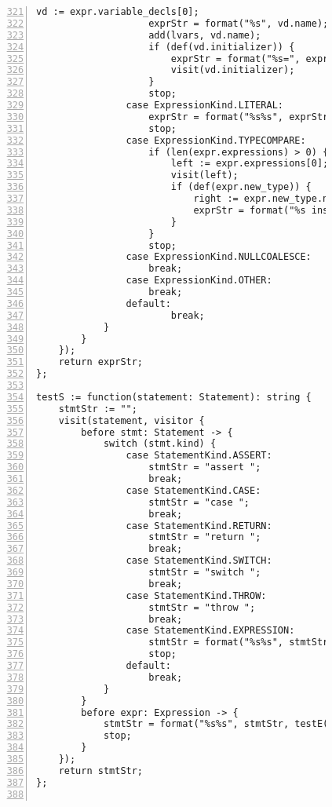 \begin{figure}[ht!]
\begin{lstlisting}[numbers=left, tabsize=4, escapechar=@, caption={API Usage Mining Analysis},label={lst:aun-code},  firstline = 321, firstnumber = 321, lastline = 381]
                    vd := expr.variable_decls[0];
                    exprStr = format("%s", vd.name);
                    add(lvars, vd.name);
                    if (def(vd.initializer)) {
                        exprStr = format("%s=", exprStr);
                        visit(vd.initializer);
                    }
                    stop;
                case ExpressionKind.LITERAL:
                    exprStr = format("%s%s", exprStr, expr.literal);
                    stop;
                case ExpressionKind.TYPECOMPARE:
                    if (len(expr.expressions) > 0) {
                        left := expr.expressions[0];
                        visit(left);
                        if (def(expr.new_type)) {
                            right := expr.new_type.name;
                            exprStr = format("%s instanceof %s", exprStr, right);
                        }
                    }
                    stop;
                case ExpressionKind.NULLCOALESCE:
                    break;
                case ExpressionKind.OTHER:
                    break;
                default:    
                        break;
            }
        }
    });
    return exprStr;
};

testS := function(statement: Statement): string {
    stmtStr := "";
    visit(statement, visitor {
        before stmt: Statement -> {
            switch (stmt.kind) {
                case StatementKind.ASSERT:
                    stmtStr = "assert ";
                    break;
                case StatementKind.CASE:
                    stmtStr = "case ";
                    break;
                case StatementKind.RETURN:
                    stmtStr = "return ";
                    break;
                case StatementKind.SWITCH:
                    stmtStr = "switch ";
                    break;
                case StatementKind.THROW:
                    stmtStr = "throw ";
                    break;
                case StatementKind.EXPRESSION:
                    stmtStr = format("%s%s", stmtStr, testE(stmt.expression));
                    stop;
                default:    
                    break;
            }
        }
        before expr: Expression -> {
            stmtStr = format("%s%s", stmtStr, testE(expr));    
            stop;
        }
    });
    return stmtStr;
};


\end{lstlisting}
\end{figure}
